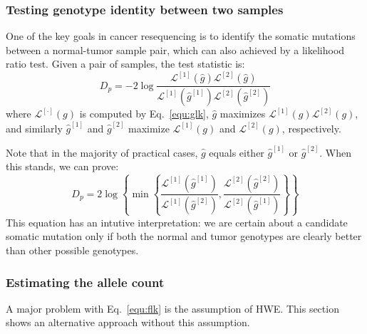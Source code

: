 \documentclass{bioinfo}
\begin{document}
\begin{methods}
\subsubsection{Testing genotype identity between two samples}
One of the key goals in cancer resequencing is to identify the somatic mutations
between a normal-tumor sample pair, which can also achieved by a likelihood ratio test.
Given a pair of samples, the test statistic is:
\begin{equation}
D_p=-2\log\frac{\mathcal{L}^{[1]}(\hat{g})\mathcal{L}^{[2]}(\hat{g})}{\mathcal{L}^{[1]}(\hat{g}^{[1]})\mathcal{L}^{[2]}(\hat{g}^{[2]})}
\end{equation}
where $\mathcal{L}^{[\cdot]}(g)$ is computed by Eq.~\eqref{equ:glk}, $\hat{g}$
maximizes $\mathcal{L}^{[1]}(g)\mathcal{L}^{[2]}(g)$, and similarly $\hat{g}^{[1]}$
and $\hat{g}^{[2]}$ maximize $\mathcal{L}^{[1]}(g)$ and $\mathcal{L}^{[2]}(g)$, respectively.

Note that in the majority of practical cases, $\hat{g}$ equals either $\hat{g}^{[1]}$ or $\hat{g}^{[2]}$.
When this stands, we can prove:
$$
D_p=2\log\left\{ \min\left\{\frac{\mathcal{L}^{[1]}(\hat{g}^{[1]})}{\mathcal{L}^{[1]}(\hat{g}^{[2]})},\frac{\mathcal{L}^{[2]}(\hat{g}^{[2]})}{\mathcal{L}^{[2]}(\hat{g}^{[1]})}\right\}\right\}
$$
This equation has an intutive interpretation: we are certain about
a candidate somatic mutation only if both the normal and tumor genotypes
are clearly better than other possible genotypes.

\subsubsection{Estimating the allele count}
A major problem with Eq.~\eqref{equ:flk} is the assumption of HWE. This section
shows an alternative approach without this assumption.


\end{methods}
\end{document}

